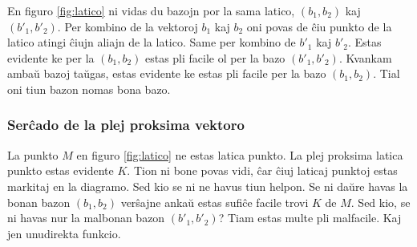 \documentclass[utf8]{scrartcl}
\makeatletter
\renewenvironment{figure}[1][]{%
  \ifthenelse{\equal{#1}{}}{%
    \@float{figure}%
  }{%
    \@float{figure}[#1]%
  }%
  \centering%
}{%
\end@float\ignorespaces\ignorespacesafterend%
}
\makeatother
\begin{document}
\begin{figure}
  \caption{Dudimensia latico kun la bazaj vektoroj $b_1$ kaj $b_2$}
  \label{fig:latico}
\end{figure}

En figuro \ref{fig:latico} ni vidas du bazojn por la sama latico, $(b_1, b_2)$
kaj $(b'_1, b'_2)$. Per kombino de la vektoroj $b_1$ kaj $b_2$ oni povas de ĉiu
punkto de la latico atingi ĉiujn aliajn de la latico. Same per kombino de
$b'_1$ kaj $b'_2$. Estas evidente ke per la $(b_1, b_2)$ estas pli facile ol
per la bazo $(b'_1, b'_2)$. Kvankam ambaŭ bazoj taŭgas, estas evidente ke estas
pli facile per la bazo $(b_1, b_2)$. Tial oni tiun bazon nomas bona bazo.

\subsubsection{Serĉado de la plej proksima vektoro}

La punkto $M$ en figuro \ref{fig:latico} ne estas latica punkto. La plej
proksima latica punkto estas evidente $K$. Tion ni bone povas vidi, ĉar ĉiuj
laticaj punktoj estas markitaj en la diagramo. Sed kio se ni ne havus tiun
helpon. Se ni daŭre havas la bonan bazon $(b_1, b_2)$ verŝajne ankaŭ estas sufiĉe
facile trovi $K$ de $M$. Sed kio, se ni havas nur la malbonan bazon
$(b'_1, b'_2)$? Tiam estas multe pli malfacile. Kaj jen unudirekta funkcio.
\end{document}
